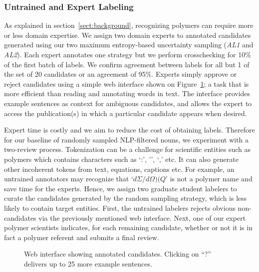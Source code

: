 \subsubsection{Untrained and Expert Labeling}
As explained in section~\ref{sect:background}, recognizing polymers can require more or less domain expertise.
We assign two domain experts to annotated candidates generated using our two maximum entropy-based uncertainty sampling (\textit{AL1} and \textit{AL2}). 
Each expert annotates one strategy but we perform crosschecking for 10\% of the first batch of labels. We confirm agreement between labels for all but 1 of the set of 20 candidates or an agreement of 95\%.
Experts simply approve or reject candidates using a simple web interface shown on Figure~\ref{fig:polyner}; a task that is more efficient than reading and annotating words in text.
The interface
provides example sentences as context for ambiguous candidates,
and allows the expert to access the publication(s) in which a particular candidate
appears when desired.

Expert time is costly and we aim to reduce the cost of obtaining labels.
Therefore for our baseline of randomly sampled NLP-filtered nouns, we experiment with a two-review process.
Tokenization can be a challenge for scientific entities such as polymers which contains characters such as `:', '\textendash', `,' etc. It can also generate other incoherent tokens from text, equations, captions etc.
For example, an untrained annotators may recognize that `$d\Sigma/d\Omega)(Q$' is not a polymer name and save time for the experts.
Hence, we assign two graduate student labelers to curate the candidates generated by the random sampling strategy, which is less likely to contain target entities.
First, the untrained labelers rejects obvious non-candidates via the previously mentioned web interface. 
Next, one of our expert polymer scientists indicates, for each remaining
candidate, whether or not it is in fact a polymer referent and submits a final review.



\begin{figure}
\centering
{}
\caption{\label{fig:polyner} Web interface showing annotated candidates.
Clicking on ``?'' delivers up to 25 more example sentences.
}
\end{figure}

